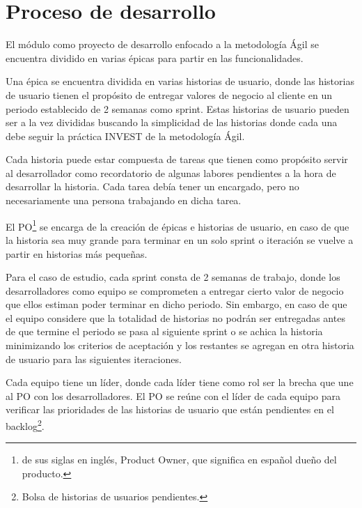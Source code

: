 \section{Proceso de desarrollo}
El módulo como proyecto de desarrollo enfocado a la metodología Ágil se encuentra dividido en varias épicas para partir en las funcionalidades.

Una épica se encuentra dividida en varias historias de usuario, donde las historias de usuario tienen el propósito de entregar valores de negocio al cliente en un periodo establecido de 2 semanas como sprint. Estas historias de usuario pueden ser a la vez divididas buscando la simplicidad de las historias donde cada una debe seguir la práctica INVEST de la metodología Ágil.

Cada historia puede estar compuesta de tareas que tienen como propósito servir al desarrollador como recordatorio de algunas labores pendientes a la hora de desarrollar la historia. Cada tarea debía tener un encargado, pero no necesariamente una persona trabajando en dicha tarea.


El PO\footnote{de sus siglas en inglés, Product Owner, que significa en español dueño del producto.} se encarga de la creación de épicas e historias de usuario, en caso de que la historia sea muy grande para terminar en un solo sprint o iteración se vuelve a partir en historias más pequeñas. 

Para el caso de estudio, cada sprint consta de 2 semanas de trabajo, donde los desarrolladores como equipo se comprometen a entregar cierto valor de negocio que ellos estiman poder terminar en dicho periodo. Sin embargo, en caso de que el equipo considere que la totalidad de historias no podrán ser entregadas antes de que termine el periodo se pasa al siguiente sprint o se achica la historia minimizando los criterios de aceptación y los restantes se agregan en otra historia de usuario para las siguientes iteraciones.

Cada equipo tiene un líder, donde cada líder tiene como rol ser la brecha que une al PO con los desarrolladores. El PO se reúne con el líder de cada equipo para verificar las prioridades de las historias de usuario que están pendientes en el backlog\footnote{Bolsa de historias de usuarios pendientes.}. 

